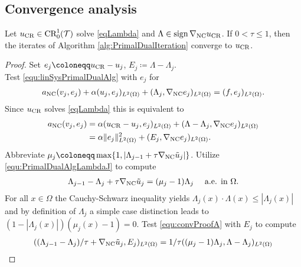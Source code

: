 \subsection{Convergence analysis}

\begin{theorem}
  Let $u_{\textup{CR}}\in \textup{CR}^1_0(\mathcal T)$ solve \eqref{eqLambda}
  and $\Lambda\in\operatorname{sign}\nabla_\textup{NC}u_\textup{CR}$.
  If $0 < \tau \leq 1$, then the iterates of Algorithm
  \ref{alg:PrimalDualIteration} converge to $u_{\textup{CR}}$.
\end{theorem}

\begin{proof}
  Set $e_j \coloneqq u_{\textup{CR}}-u_j$, $E_j\coloneqq \Lambda-\Lambda_j$.\\
  Test \eqref{equ:linSysPrimalDualAlg} with $e_j$ for
  \begin{align*}
    a_\textup{NC}(v_j,e_j) + \alpha(u_j,e_j)_{L^2(\Omega)} 
    + (\Lambda_j,\nabla_\textup{NC}e_j)_{L^2(\Omega)}
    = 
    (f,e_j)_{L^2(\Omega)}.
  \end{align*}
  Since $u_{\textup{CR}}$ solves \eqref{eqLambda} this is equivalent to
  \begin{align}
    \label{equ:convProofE}
    a_\textup{NC}(v_j,e_j) &= 
    \alpha(u_\textup{CR}-u_j,e_j)_{L^2(\Omega)} 
    + (\Lambda-\Lambda_j,\nabla_\textup{NC}e_j)_{L^2(\Omega)} \notag\\
    &= 
    \alpha\Vert e_j\Vert_{L^2(\Omega)}^2
    + (E_j,\nabla_\textup{NC}e_j)_{L^2(\Omega)}.
  \end{align}
  Abbreviate $\mu_j\coloneqq \max\{1,|\Lambda_{j-1}+\tau
  \nabla_\textup{NC}\tilde{u}_j|\}$.
  Utilize \eqref{equ:PrimalDualAlgLambdaJ} to compute
  \begin{align}
    \label{equ:convProofA}
    \Lambda_{j-1}-\Lambda_j+\tau \nabla_\textup{NC}\tilde{u}_j 
    = (\mu_j-1)\Lambda_j \quad\text{ a.e. in }\Omega.
  \end{align}
  For all $x\in\Omega$ the Cauchy-Schwarz inequality yields
  $\Lambda_j(x)\cdot\Lambda(x)\leq|\Lambda_j(x)|$ 
  and by definition of $\Lambda_j$ a simple case distinction leads to
  $(1-|\Lambda_j(x)|)(\mu_j(x)-1)=0$.
  Test \eqref{equ:convProofA} with $E_j$ to compute
  \begin{align*}
    ( (\Lambda_{j-1}-\Lambda_j)/\tau+\nabla_\textup{NC}\tilde{u}_j,
    E_j)_{L^2(\Omega)}
    &= 
    1/\tau ( (\mu_j-1)\Lambda_j,\Lambda-\Lambda_j)_{L^2(\Omega)}\\

\end{align*}
\end{proof}
